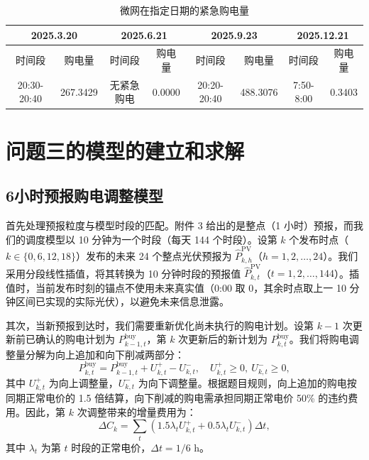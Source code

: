 \documentclass[withoutpreface,bwprint]{cumcmthesis}
\begin{document}
\begin{table}[h!]
	\centering
	\footnotesize
	\renewcommand{\arraystretch}{1.2}
	\setlength{\tabcolsep}{8pt}
	\caption{微网在指定日期的紧急购电量}
	\label{tab:q2_spec_3}
	\begin{tabular}{|c|c|c|c|c|c|c|c|}
		\hline
		\multicolumn{2}{|c|}{2025.3.20} & \multicolumn{2}{c|}{2025.6.21} & \multicolumn{2}{c|}{2025.9.23} & \multicolumn{2}{c|}{2025.12.21} \\ \hline
		时间段 & 购电量 & 时间段 & 购电量 & 时间段 & 购电量 & 时间段 & 购电量 \\ \hline
		20:30-20:40 & 267.3429 & 无紧急购电 & 0.0000 & 20:20-20:40 & 488.3076 & 7:50-8:00 & 0.3403 \\ \hline
	\end{tabular}
\end{table}








\section{问题三的模型的建立和求解}

\subsection{6小时预报购电调整模型}

首先处理预报粒度与模型时段的匹配。附件 3 给出的是整点（1 小时）预报，而我们的调度模型以 10 分钟为一个时段（每天 144 个时段）。设第 $k$ 个发布时点（$k \in \{0, 6, 12, 18\}$）发布的未来 24 个整点光伏预报为 $\hat{P}^{\mathrm{PV}}_{k, h}$（$h=1,2,\dots,24$）。我们采用分段线性插值，将其转换为 10 分钟时段的预报值 $\hat{P}^{\mathrm{PV}}_{k, t}$（$t=1,2,\dots,144$）。插值时，当前发布时刻的锚点不使用未来真实值（0:00 取 0，其余时点取上一 10 分钟区间已实现的实际光伏），以避免未来信息泄露。

其次，当新预报到达时，我们需要重新优化尚未执行的购电计划。设第 $k-1$ 次更新前已确认的购电计划为 $P^{\mathrm{buy}}_{k-1,t}$，第 $k$ 次更新后的新计划为 $P^{\mathrm{buy}}_{k,t}$。我们将购电调整量分解为向上追加和向下削减两部分：
\begin{equation}
	P^{\mathrm{buy}}_{k,t} = P^{\mathrm{buy}}_{k-1,t} + U^{+}_{k,t} - U^{-}_{k,t}, \quad U^{+}_{k,t} \ge 0,\ U^{-}_{k,t} \ge 0,
	\label{eq:q3adj}
\end{equation}
其中 $U^{+}_{k,t}$ 为向上调整量，$U^{-}_{k,t}$ 为向下调整量。根据题目规则，向上追加的购电按同期正常电价的 1.5 倍结算，向下削减的购电需承担同期正常电价 50\% 的违约费用。因此，第 $k$ 次调整带来的增量费用为：
\begin{equation}
	\Delta C_k = \sum_{t} \left( 1.5\lambda_t U^{+}_{k,t} + 0.5\lambda_t U^{-}_{k,t} \right) \Delta t,
	\label{eq:q3adjcost}
\end{equation}
其中 $\lambda_t$ 为第 $t$ 时段的正常电价，$\Delta t = 1/6$ h。
\end{document}
